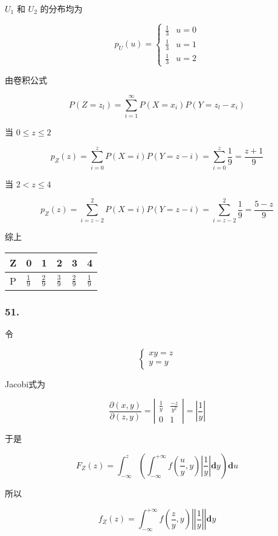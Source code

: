 \documentclass[]{article}
\begin{document}
\(U_1\) 和 \(U_2\) 的分布均为

\[p_{U}(u)=\left\{\begin{array}{ll}
{\frac{1}{3}} & {u=0} \\ 
{\frac{1}{3}} & {u=1}\\
{\frac{1}{3}} & {u=2}
\end{array}\right.\]

由卷积公式

\[P\left(Z=z_{l}\right)=\sum_{i=1}^{\infty} P\left(X=x_{i}\right) P\left(Y=z_{l}-x_{i}\right)\]

当 \(0\le z\le2\)

\[p_{Z}(z)=\sum_{i=0}^{z} P\left(X=i\right) P\left(Y=z-i\right)=\sum_{i=0}^{z} \frac{1}{9} =\frac{z+1}{9}\]

当 \(2< z\le4\)

\[p_{Z}(z)=\sum_{i=z-2}^{2} P\left(X=i\right) P\left(Y=z-i\right)=\sum_{i=z-2}^{2} \frac{1}{9} =\frac{5-z}{9}\]

综上

\begin{longtable}[]{@{}llllll@{}}
\toprule
Z & 0 & 1 & 2 & 3 & 4\tabularnewline
\midrule
\endhead
P & \(\frac{1}{9}\) & \(\frac{2}{9}\) & \(\frac{3}{9}\) &
\(\frac{2}{9}\) & \(\frac{1}{9}\)\tabularnewline
\bottomrule
\end{longtable}

\subsubsection{51.}\label{header-n41}

令

\[\left\{\begin{array}{r}{x  y=z} \\ {y=y}\end{array}\right.\]

Jacobi式为

\[\frac{\partial(x, y)}{\partial(z, y)}=\left|\begin{array}{ll}{\frac{1}{y}} & {\frac{-z}{y^2}} \\ {0} & {1}\end{array}\right|=\left|\frac{1}{y}\right|\]

于是

\[F_{Z}(z)=\int_{-\infty}^{z}\left(\int_{-\infty}^{+\infty} f(\frac{u}{y}, y)\left|\frac{1}{y}\right| \mathbf{d} y\right) \mathbf{d} u\]

所以

\[f_{Z}(z)=\int_{-\infty}^{+\infty} f(\frac{z}{y}, y)|\left|\frac{1}{y}\right|| \mathbf{d} y\]
\end{document}
